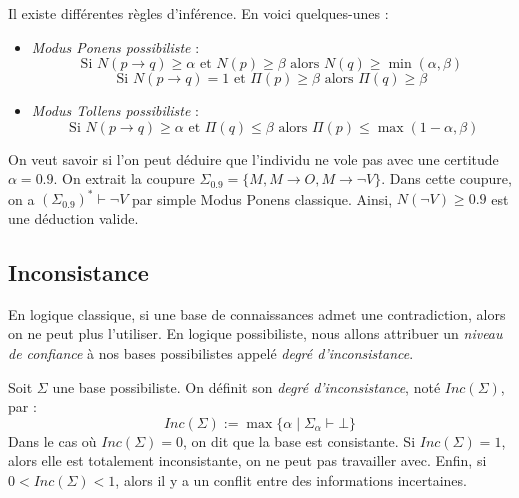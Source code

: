 \begin{proposition}
    Il existe différentes règles d'inférence. En voici quelques-unes :
    \begin{itemize}
        \item \emph{Modus Ponens possibiliste} : 
        \begin{equation}
            \text{Si } N( p \to q) \geqslant \alpha \text{ et } N(p) \geqslant \beta \text{ alors } N(q) \geqslant \min( \alpha, \beta)
        \end{equation}
        \begin{equation}
            \text{Si } N(p \to q) = 1 \text{ et } \Pi(p) \geqslant \beta \text{ alors } \Pi(q) \geqslant \beta 
        \end{equation}
        \item \emph{Modus Tollens possibiliste} : 
        \begin{equation}
            \text{ Si } N(p \to q) \geqslant \alpha \text{ et } \Pi(q) \leqslant \beta \text{ alors } \Pi(p) \leqslant \max(1 - \alpha, \beta)  
        \end{equation}
    \end{itemize}
\end{proposition}

\begin{example}
    On veut savoir si l'on peut déduire que l'individu ne vole pas avec une certitude $\alpha = 0.9$. 
    On extrait la coupure $\Sigma_{0.9} = \{ M, M \to O, M \to \neg V \}$.
    Dans cette coupure, on a $(\Sigma_{0.9})^* \vdash \neg V$ par simple Modus Ponens classique.
    Ainsi, $N(\neg V) \geqslant 0.9$ est une déduction valide.
\end{example}

\subsection{Inconsistance}

En logique classique, si une base de connaissances admet une contradiction, alors on ne peut plus 
l'utiliser. En logique possibiliste, nous allons attribuer un \emph{niveau de confiance} à nos 
bases possibilistes appelé \emph{degré d'inconsistance}. 

\begin{definition}
    Soit $ \Sigma$ une base possibiliste. On définit son \emph{degré d'inconsistance}, noté 
    $Inc( \Sigma)$, par : 
        \begin{equation}
            \boxed{Inc( \Sigma) := \max \{ \alpha \mid \Sigma_\alpha \vdash \bot\}}
        \end{equation}
    Dans le cas où $ Inc( \Sigma) = 0$, on dit que la base est consistante. Si $Inc( \Sigma) = 1$, alors 
    elle est totalement inconsistante, on ne peut pas travailler avec. 
    Enfin, si $ 0 < Inc( \Sigma) < 1$, alors il y a un conflit entre des informations incertaines. 
\end{definition}

